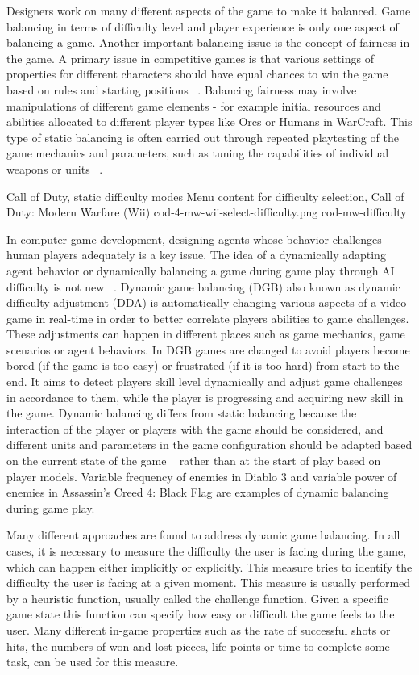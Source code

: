 Designers work on many different aspects of the game to make it balanced. Game balancing in terms of difficulty level and player experience is only one aspect of balancing a game. Another important balancing issue is the concept of fairness in the game. A primary issue in competitive games is that various settings of properties for different characters should have equal chances to win the game based on rules and starting positions ~\cite{rollings2003andrew}. Balancing fairness may involve manipulations of different game elements - for example initial resources and abilities allocated to different player  types like Orcs or Humans in WarCraft. This type of static balancing is often carried out through repeated playtesting of the game mechanics and parameters, such as tuning the capabilities of individual weapons or units ~\cite{boll2003paper, rollings2003andrew}.

\largeimg
{Call of Duty, static difficulty modes}
{Menu content for difficulty selection, Call of Duty: Modern Warfare (Wii)}
{cod-4-mw-wii-select-difficulty.png}
{cod-mw-difficulty}

In computer game development, designing agents whose behavior challenges human players adequately is a key issue. The idea of a dynamically adapting agent behavior or dynamically balancing a game during game play through AI difficulty is not new ~\cite{andrade2005automatic}. Dynamic game balancing (DGB) also known as dynamic difficulty adjustment (DDA) is automatically changing various aspects of a video game in real-time in order to better correlate players abilities to game challenges. These adjustments can happen in different places such as game mechanics, game scenarios or agent behaviors. In DGB games are changed to avoid players become bored (if the game is too easy) or frustrated (if it is too hard) from start to the end. It aims to detect players skill level dynamically and adjust game challenges in accordance to them, while the player is progressing and acquiring new skill in the game. Dynamic balancing differs from static balancing because the interaction of the player or players with the game should be considered, and different units and parameters in the game configuration should be adapted based on the current state of the game ~\cite{tan2011dynamic} rather than at the start of play based on player models. Variable frequency of enemies in Diablo 3 and variable power of enemies in Assassin's Creed 4: Black Flag are examples of dynamic balancing during game play.

Many different approaches are found to address dynamic game balancing. In all cases, it is necessary to measure the difficulty the user is facing during the game, which can happen either implicitly or explicitly. This measure tries to identify the difficulty the user is facing at a given moment. This measure is usually performed by a heuristic function, usually called the challenge function. Given a specific game state this function can specify how easy or difficult the game feels to the user. Many different in-game properties such as the rate of successful shots or hits, the numbers of won and lost pieces, life points or time to complete some task, can be used for this measure.

